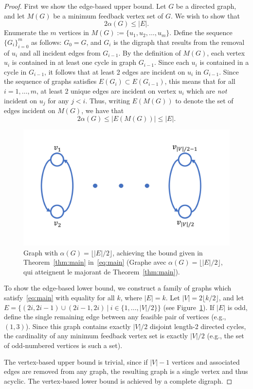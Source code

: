 \documentclass[onecolumn]{IEEETran}
\begin{document}
\begin{proof}
First we show the edge-based upper bound.
Let $G$ be a directed graph, and let $M(G)$ be a minimum feedback vertex set of $G$.
We wish to show that 
\begin{equation}
2\alpha(G)\leq |E|.
\end{equation}
Enumerate the $m$ vertices in $M(G):=\{u_1,u_2,\ldots,u_m\}$.
Define the sequence $\{G_i\}_{i=0}^m$ as follows: $G_0=G$, and $G_i$ is the digraph that results from the removal of $u_i$ and all incident edges from $G_{i-1}$.
By the definition of $M(G)$, each vertex $u_i$ is contained in at least one cycle in graph $G_{i-1}$.
Since each $u_i$ is contained in a cycle in $G_{i-1}$, it follows that at least 2 edges are incident on $u_i$ in $G_{i-1}$.
Since the sequence of graphs satisfies $E(G_{i})\subset E(G_{i-1})$, this means that for all $i=1,\ldots,m$, at least 2 unique edges are incident on vertex $u_i$ which are \emph{not} incident on $u_j$ for any $j<i$.
%
Thus, writing $E(M(G))$ to denote the set of edges incident on $M(G)$, we have that
\begin{equation}
2\alpha(G)\leq|E(M(G))|\leq |E|.
\end{equation}

\begin{figure}[b]
\centering
\includegraphics[width=.5\textwidth]{gfx/graph}
\caption{\label{fig:graph} Graph with $\alpha(G)=\lfloor|E|/2\rfloor$, achieving the bound given in Theorem~\ref{thm:main} in~\eqref{eq:main} (Graphe avec $\alpha(G)=\lfloor|E|/2\rfloor$, qui atteignent le majorant de Theorem~\ref{thm:main}).}
\end{figure}

To show the edge-based lower bound, we construct a family of graphs which satisfy~\eqref{eq:main} with equality for all $k$, where $|E|=k$.
Let $|V|=2\lfloor k/2\rfloor$, and let $E=\{(2i,2i-1)\cup(2i-1,2i)\ |\ i\in\{1,\ldots,|V|/2\}\}$ (see Figure~\ref{fig:graph}).
If $|E|$ is odd, define the single remaining edge between any feasible pair of vertices (e.g., $(1,3)$).
Since this graph contains exactly $|V|/2$ disjoint length-2 directed cycles, the cardinality of any minimum feedback vertex set is exactly $|V|/2$ (e.g., the set of odd-numbered vertices is such a set).
%


The vertex-based upper bound is trivial, since if $|V|-1$ vertices and associated edges are removed from any graph, the resulting graph is a single vertex and thus acyclic.
The vertex-based lower bound is achieved by a complete digraph.
\end{proof}








\end{document}
